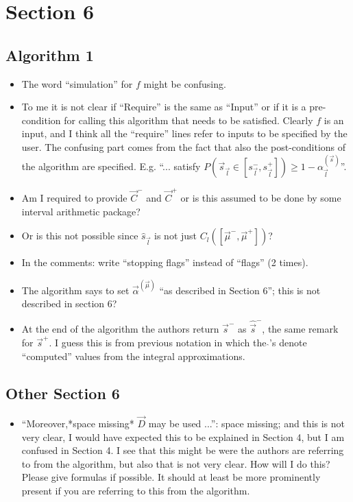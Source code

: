 \documentclass{article}[12pt]
\newcommand{\Referee}[1]{{\color{blue} #1}}
\begin{document}
\section{Section 6}

\subsection{Algorithm 1}

\begin{itemize}
    \item \Referee{The word ``simulation'' for $f$ might be confusing.}
    \item \Referee{To me it is not clear if ``Require'' is the same as ``Input'' or if it is a pre-condition for calling this algorithm that needs to be satisfied. Clearly $f$ is an input, and I think all the ``require'' lines refer to inputs to be specified by the user. The confusing part comes from the fact that also the post-conditions of the algorithm are specified. E.g. ``... satisfy $P(\vec{s}_{\vec{l}} \in [s_{\vec{l}}^-, s_{\vec{l}}^+]) \ge 1 -\alpha_{\vec{l}}^{(\vec{s})}$''.}
    \item \Referee{Am I required to provide $\vec{C}^-$ and $\vec{C}^+$ or is this assumed to be done by some interval arithmetic package?}
    \item \Referee{Or is this not possible since $\hat{s}_{\vec{l}}$ is not just $C_l([\vec{\mu}^-,\vec{\mu}^+])$?}
    \item \Referee{In the comments: write ``stopping flags'' instead of ``flags'' (2 times).}
    \item \Referee{The algorithm says to set ${\vec{\alpha}}^{(\vec{\mu})}$ ``as described in Section 6''; this is not described in section 6?}
    \item \Referee{At the end of the algorithm the authors return $\vec{s}^-$ as $\hat{\vec{s}}^-$, the same remark for $\vec{s}^+$. I guess this is from previous notation in which the $\hat{}$'s denote ``computed'' values from the integral approximations.}
\end{itemize}

\subsection{Other Section 6}

\begin{itemize}
    \item \Referee{``Moreover,*space missing* $\vec{D}$ may be used ...'': space missing; and this is not very clear, I would have expected this to be explained in Section 4, but I am confused in Section 4. I see that this might be were the authors are referring to from the algorithm, but also that is not very clear. How will I do this? Please give formulas if possible. It should at least be more prominently present if you are referring to this from the algorithm.}
\end{itemize}
\end{document}
